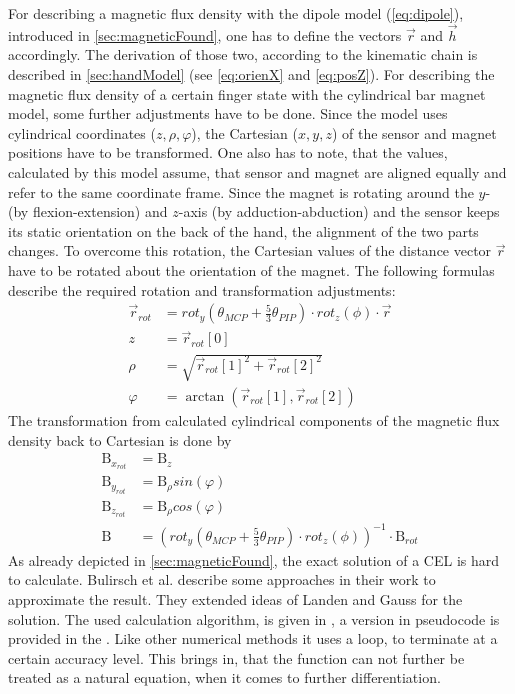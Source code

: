 For describing a magnetic flux density with the dipole model (\ref{eq:dipole}), introduced in \ref{sec:magneticFound}, one has to define the vectors $ \vec{r} $ and $ \vec{h} $ accordingly. The derivation of those two, according to the kinematic chain is described in \ref{sec:handModel} (see \ref{eq:orienX} and \ref{eq:posZ}). For describing the magnetic flux density of a certain finger state with the cylindrical bar magnet model, some further adjustments have to be done. Since the model uses cylindrical coordinates ($ z, \rho, \varphi $), the Cartesian ($ x, y, z $) of the sensor and magnet positions have to be transformed. One also has to note, that the values, calculated by this model assume, that sensor and magnet are aligned equally and refer to the same coordinate frame. Since the magnet is rotating around the $ y $- (by flexion-extension) and $ z $-axis (by adduction-abduction) and the sensor keeps its static orientation on the back of the hand, the alignment of the two parts changes. To overcome this rotation, the Cartesian values of the distance vector $ \vec{r} $ have to be rotated about the orientation of the magnet. The following formulas describe the required rotation and transformation adjustments:
\begin{equation}
\begin{aligned}
\vec{r}_{rot} &= rot_{y}(\theta_{MCP} + \frac{5}{3} \theta_{PIP}) \cdot rot_{z}(\phi) \cdot \vec{r}\\[3pt]
z &= \vec{r}_{rot}[0]\\
\rho &= \sqrt{\vec{r}_{rot}[1]^{2} + \vec{r}_{rot}[2]^2}\\
\varphi &= \arctan(\vec{r}_{rot}[1], \vec{r}_{rot}[2])
\end{aligned}
\end{equation}
The transformation from calculated cylindrical components of the magnetic flux density back to Cartesian is done by
\begin{equation}
\begin{aligned}
\mathrm{B}_{x_{rot}} &= \mathrm{B}_{z}\\
\mathrm{B}_{y_{rot}} &= \mathrm{B}_{\rho}sin(\varphi)\\
\mathrm{B}_{z_{rot}} &= \mathrm{B}_{\rho}cos(\varphi)\\[3pt]
\mathrm{B} &= (rot_{y}(\theta_{MCP} + \frac{5}{3} \theta_{PIP}) \cdot rot_{z}(\phi))^{-1} \cdot \mathrm{B}_{rot}
\end{aligned}
\end{equation}
As already depicted in \ref{sec:magneticFound}, the exact solution of a \ac{CEL} is hard to calculate. Bulirsch et al. \cite{bulirsch1965numerical} describe some approaches in their work to approximate the result. They extended ideas of Landen and Gauss for the solution. The used calculation algorithm, is given in \cite{derby2010cylindrical}, a version in pseudocode is provided in the . Like other numerical methods it uses a loop, to terminate at a certain accuracy level. This brings in, that the function can not further be treated as a natural equation, when it comes to further differentiation.



